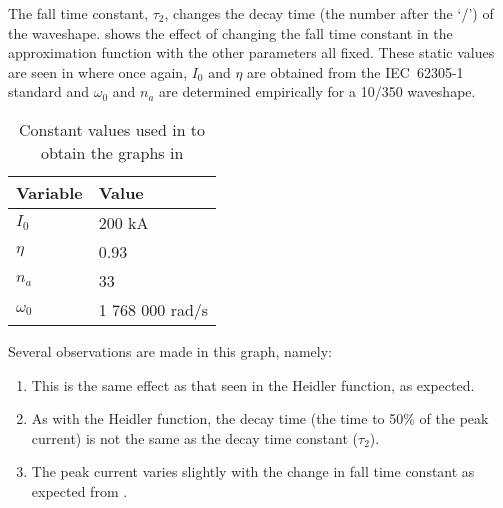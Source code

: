 The fall time constant, $\tau_2$, changes the decay time (the number after the `/') of the waveshape.  shows the effect of changing the fall time constant in the approximation function with the other parameters all fixed. These static values are seen in  where once again, $I_0$ and $\eta$ are obtained from the IEC~62305-1 standard and $\omega_0$ and $n_a$ are determined empirically for a 10/350 waveshape.
\begin{table}[htbp]
    \centering
    \caption{Constant values used in  to obtain the graphs in }
    \begin{tabular}{ll}
        \textbf{Variable} & \textbf{Value} \\
        \hline
        $I_0$ & 200 kA \\
        $\eta$ & 0.93 \\
        $n_a$ & 33 \\
        $\omega_0$ & 1 768 000 rad/s
    \end{tabular}
    \label{tab:approxConstsFall}
\end{table}

Several observations are made in this graph, namely:
\begin{enumerate}
    \item This is the same effect as that seen in the Heidler function, as expected.
    \item As with the Heidler function, the decay time (the time to 50\% of the peak current) is not the same as the decay time constant ($\tau_2$).
    \item The peak current varies slightly with the change in fall time constant as expected from .
\end{enumerate}

